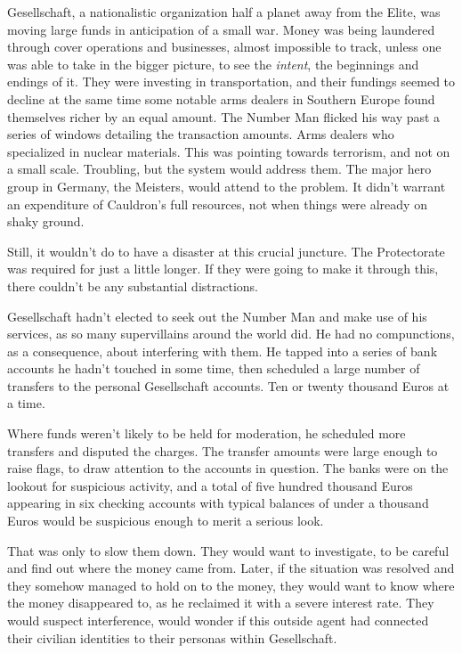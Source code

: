 Gesellschaft, a nationalistic organization half a planet away from the Elite, was moving large funds in anticipation of a small war.  Money was being laundered through cover operations and businesses, almost impossible to track, unless one was able to take in the bigger picture, to see the \emph{intent}, the beginnings and endings of it.  They were investing in transportation, and their fundings seemed to decline at the same time some notable arms dealers in Southern Europe found themselves richer by an equal amount.  The Number Man flicked his way past a series of windows detailing the transaction amounts.  Arms dealers who specialized in nuclear materials.  This was pointing towards terrorism, and not on a small scale.  Troubling, but the system would address them.  The major hero group in Germany, the Meisters, would attend to the problem.  It didn't warrant an expenditure of Cauldron's full resources, not when things were already on shaky ground.



Still, it wouldn't do to have a disaster at this crucial juncture.  The Protectorate was required for just a little longer.  If they were going to make it through this, there couldn't be any substantial distractions.



Gesellschaft hadn't elected to seek out the Number Man and make use of his services, as so many supervillains around the world did.  He had no compunctions, as a consequence, about interfering with them.  He tapped into a series of bank accounts he hadn't touched in some time, then scheduled a large number of transfers to the personal Gesellschaft accounts.  Ten or twenty thousand Euros at a time.



Where funds weren't likely to be held for moderation, he scheduled more transfers and disputed the charges.  The transfer amounts were large enough to raise flags, to draw attention to the accounts in question.  The banks were on the lookout for suspicious activity, and a total of five hundred thousand Euros appearing in six checking accounts with typical balances of under a thousand Euros would be suspicious enough to merit a serious look.



That was only to slow them down.  They would want to investigate, to be careful and find out where the money came from.  Later, if the situation was resolved and they somehow managed to hold on to the money, they would want to know where the money disappeared to, as he reclaimed it with a severe interest rate.  They would suspect interference, would wonder if this outside agent had connected their civilian identities to their personas within Gesellschaft.



